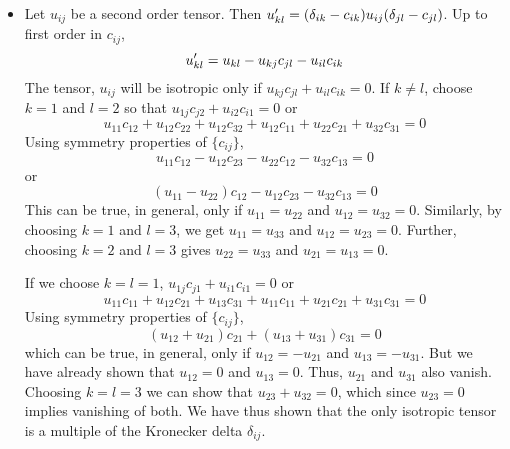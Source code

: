 \begin{itemize}
\item Let $u_{ij}$ be a second order tensor. Then $u_{kl}^\prime = (\delta_{ik} - c_{ik})u_{ij}(\delta_{jl} - c_{jl})$. Up to first order in $c_{ij}$,
\[
u_{kl}^\prime = u_{kl} - u_{kj}c_{jl} - u_{il}c_{ik}
\]
The tensor, $u_{ij}$ will be isotropic only if $u_{kj}c_{jl} + u_{il}c_{ik} = 0$. If $k \ne l$, choose $k = 1$ and $l = 2$ so that $u_{1j}c_{j2} + u_{i2}c_{i1} = 0$ or
\[
u_{11}c_{12} + u_{12}c_{22} + u_{12}c_{32} + u_{12}c_{11} + u_{22}c_{21} + u_{32}c_{31} = 0
\]
Using symmetry properties of $\{c_{ij}\}$,
\[
u_{11}c_{12} - u_{12}c_{23} - u_{22}c_{12} - u_{32}c_{13} = 0
\]
or
\[
(u_{11} - u_{22})c_{12} - u_{12}c_{23} - u_{32}c_{13} = 0
\]
This can be true, in general, only if $u_{11} = u_{22}$ and $u_{12} = u_{32} = 0$. Similarly, by choosing $k = 1$ and $l = 3$, we get $u_{11} = u_{33}$ and $u_{12} = u_{23} = 0$. 
Further, choosing $k = 2$ and $l = 3$ gives $u_{22} = u_{33}$ and $u_{21} = u_{13} = 0$.

If we choose $k = l = 1$, $u_{1j}c_{j1} + u_{i1}c_{i1} = 0$ or
\[
u_{11}c_{11} + u_{12}c_{21} + u_{13}c_{31} + u_{11}c_{11} + u_{21}c_{21} + u_{31}c_{31} = 0
\]
Using symmetry properties of $\{c_{ij}\}$,
\[
(u_{12} + u_{21})c_{21} + (u_{13} + u_{31})c_{31} = 0
\]
which can be true, in general, only if $u_{12} = -u_{21}$ and $u_{13} = -u_{31}$. But we have already shown that $u_{12} = 0$ and $u_{13} = 0$. Thus, $u_{21}$ and $u_{31}$ also vanish.
Choosing $k = l = 3$ we can show that $u_{23} + u_{32} = 0$, which since $u_{23} = 0$ implies vanishing of both. We have thus shown that the only isotropic tensor is a multiple of the
Kronecker delta $\delta_{ij}$.


\end{itemize}
